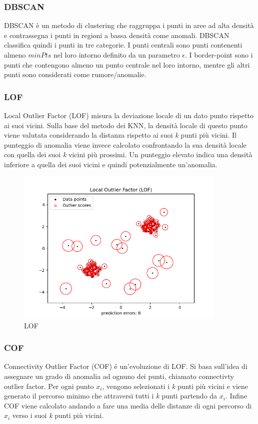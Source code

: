 \subsubsection{DBSCAN}
DBSCAN è un metodo di clustering che raggruppa i punti in aree ad alta densità e contrassegna i punti in regioni a bassa densità come anomali.
DBSCAN classifica quindi i punti in tre categorie. I punti centrali sono punti
contenenti almeno $minPts$ nel loro intorno definito da un parametro $\epsilon$. I border-point sono i punti che contengono almeno un punto centrale nel loro intorno, mentre gli altri punti sono considerati come rumore/anomalie. 


\subsubsection{LOF}
Local Outlier Factor (LOF) misura la deviazione locale di un dato punto rispetto ai suoi vicini. Sulla base del metodo dei KNN, la densità locale di questo punto viene valutata considerando la distanza rispetto ai suoi \textit{k} punti più vicini. Il punteggio di anomalia viene invece calcolato confrontando la sua densità locale con quella dei suoi \textit{k} vicini più prossimi. Un punteggio elevato indica una densità inferiore a quella dei suoi vicini e quindi potenzialmente un'anomalia.
\begin{figure}[t]
	\centering
	\includegraphics[width=10cm, scale=1]{images/lof}
	\caption{LOF}
	\label{lof}
\end{figure}

\subsubsection{COF}
Connectivity Outlier Factor (COF) é un'evoluzione di LOF. Si basa sull'idea di assegnare un grado di anomalia ad ognuno dei punti, chiamato connectivty outlier factor.
Per ogni punto $x_i$, vengono selezionati i \textit{k} punti più vicini e viene generato il percorso minimo che attraversi tutti i \textit{k} punti partendo da $x_i$. Infine COF viene calcolato andando a fare una media delle distanze di ogni percorso di $x_i$ verso i suoi \textit{k} punti più vicini.

